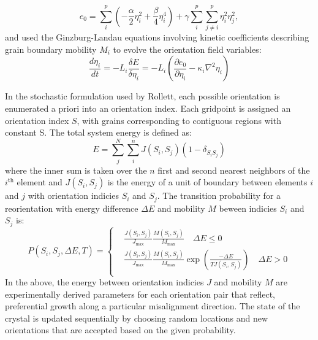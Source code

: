 \documentclass[11pt]{article}
\newcommand{\MarginPar}[1]{\marginpar{%
\vskip-\baselineskip %
\raggedright\tiny\sffamily
\hrule\smallskip{\color{red}#1}\par\smallskip\hrule}}
\begin{document}
\begin{equation}
  \label{eq:detgraine0}
  e_0 = \sum_i^p \left( - \frac{\alpha}{2} \eta_i^2 + \frac{\beta}{4}\eta_i^4\right) + \gamma\sum_i^p \sum_{j\ne i}^p \eta_i^2\eta_j^2,
\end{equation}
and used the Ginzburg-Landau equations involving kinetic coefficients describing grain boundary mobility $M_i$ to evolve the orientation field variables:
\MarginPar{JBB what is $L_i$}
\begin{equation}
  \label{eq:detgrainGL}
  \frac{d \eta_i}{dt} = -L_i \frac{\delta E}{\delta \eta_i}= -L_i \left( \frac{\partial e_0}{\partial \eta_i} - \kappa_i \nabla^2\eta_i \right)
\end{equation}

In the stochastic formulation used by Rollett, each possible orientation is enumerated a priori into an orientation index. Each gridpoint is assigned an orientation index $S$, with grains corresponding to contiguous regions with constant S. The total system energy is defined as:
\begin{equation}
  \label{eq:mcgrainE}
  E = \sum_j^N \sum_i^n J(S_i, S_j) (1-\delta_{S_iS_j})
\end{equation}
where the inner sum is taken over the $n$ first and second nearest neighbors of the $i^\mathrm{th}$ element and $J(S_i,S_j)$ is the energy of a unit of boundary between elements $i$ and $j$ with orientation indicies $S_i$ and $S_j$. The transition probability for a reorientation with energy difference $\Delta E$ and mobility $M$ beween indicies $S_i$ and $S_j$ is:
\begin{equation}
  \label{eq:mcgrainP}
  P( S_i, S_j, \Delta E, T) = \left\{ \begin{aligned}
      & \frac{J(S_i,S_j)}{J_\mathrm{max}} \frac{ M(S_i, S_j) }{M_\mathrm{max}}  \quad \Delta E \le 0 \\
      & \frac{J(S_i,S_j)}{J_\mathrm{max}} \frac{ M(S_i, S_j) }{M_\mathrm{max}} \exp \left( \frac{-\Delta E}{TJ(S_i,S_j)}\right)  \quad \Delta E > 0 \\
      \end{aligned}
      \right. 
\end{equation}
In the above, the energy between orientation indicies $J$ and mobility $M$ are experimentally derived parameters for each orientation pair that reflect, preferential growth along a particular misalignment direction. The state of the crystal is updated sequentially by choosing random locations and new orientations that are accepted based on the given probability. 
\end{document}
